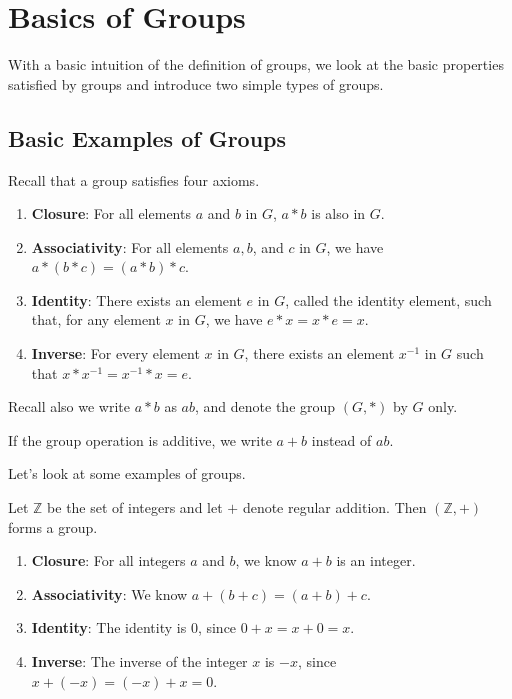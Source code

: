 \chapter{Basics of Groups}
With a basic intuition of the definition of groups, we look at the basic properties satisfied by groups and introduce two simple types of groups.

\section{Basic Examples of Groups}
Recall that a group satisfies four axioms.
\begin{enumerate}
    \item \textbf{Closure}: For all elements $a$ and $b$ in $G$, $a \ast b$ is also in $G$.
    \item \textbf{Associativity}: For all elements $a, b$, and $c$ in $G$, we have $a \ast (b \ast c) = (a \ast b) \ast c$.
    \item \textbf{Identity}: There exists an element $e$ in $G$, called the identity element, such that, for any element $x$ in $G$, we have $e \ast x = x \ast e = x$.
    \item \textbf{Inverse}: For every element $x$ in $G$, there exists an element $x^{-1}$ in $G$ such that $x \ast x^{-1} = x^{-1} \ast x = e$.
\end{enumerate}

Recall also we write $a \ast b$ as $ab$, and denote the group $(G, \ast)$ by $G$ only.

\begin{remark}
    If the group operation is additive, we write $a + b$ instead of $ab$.
\end{remark}

Let's look at some examples of groups.

\begin{example}
    Let $\mathbb{Z}$ be the set of integers and let $+$ denote regular addition. Then $(\mathbb{Z}, +)$ forms a group.
    \begin{enumerate}
        \item \textbf{Closure}: For all integers $a$ and $b$, we know $a + b$ is an integer.
        \item \textbf{Associativity}: We know $a + (b + c) = (a + b) + c$.
        \item \textbf{Identity}: The identity is 0, since $0 + x = x + 0 = x$.
        \item \textbf{Inverse}: The inverse of the integer $x$ is $-x$, since $x + (-x) = (-x) + x = 0$.
    \end{enumerate}
\end{example}

